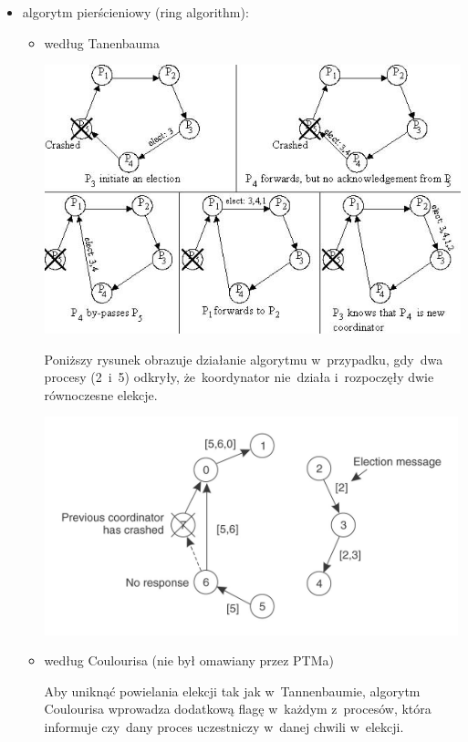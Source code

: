 {\begin{itemize}
\item algorytm pierścieniowy (ring algorithm):
    \begin{itemize}
    \item według Tanenbauma
        \begin{center}
        \includegraphics[width=15cm]{16/ring}
        \end{center}
            Poniższy rysunek obrazuje działanie algorytmu w~przypadku, gdy~dwa procesy (2~i~5) odkryły, że~koordynator nie~działa i~rozpoczęły dwie równoczesne elekcje.
    
        \includegraphics[width=12cm]{16/ring_double_election}
    
    \item według Coulourisa (nie był omawiany przez PTMa)
    
        Aby uniknąć powielania elekcji tak jak w~Tannenbaumie, algorytm Coulourisa wprowadza dodatkową flagę w~każdym z~procesów, która informuje czy~dany proces uczestniczy w~danej chwili w~elekcji.
    
    \end{itemize}
\end{itemize}}

